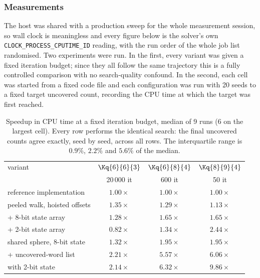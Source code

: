 \subsubsection*{Measurements}

The host was shared with a production sweep for the whole measurement
session, so wall clock is meaningless and every figure below is the solver's
own \texttt{CLOCK\_PROCESS\_CPUTIME\_ID} reading, with the run order of the
whole job list randomised. Two experiments were run. In the first, every
variant was given a fixed iteration budget; since they all follow the same
trajectory this is a fully controlled comparison with no search-quality
confound. In the second, each cell was started from a fixed code file and
each configuration was run with 20 seeds to a fixed target uncovered count,
recording the CPU time at which the target was first reached.

\begin{table}[t]
\centering
\begin{tabular}{lccc}
\toprule
variant & $\Kq{6}{6}{3}$ & $\Kq{6}{8}{4}$ & $\Kq{8}{9}{4}$ \\
        & 20\,000 it & 600 it & 50 it \\
\midrule
reference implementation      & $1.00\times$ & $1.00\times$ & $1.00\times$ \\
peeled walk, hoisted offsets  & $1.35\times$ & $1.29\times$ & $1.13\times$ \\
\quad + 8-bit state array     & $1.28\times$ & $1.65\times$ & $1.65\times$ \\
\quad + 2-bit state array     & $0.82\times$ & $1.34\times$ & $2.44\times$ \\
shared sphere, 8-bit state    & $1.32\times$ & $1.95\times$ & $1.95\times$ \\
\quad + uncovered-word list   & $2.21\times$ & $5.57\times$ & $6.06\times$ \\
\quad with 2-bit state        & $2.14\times$ & $\mathbf{6.32\times}$ & $\mathbf{9.86\times}$ \\
\bottomrule
\end{tabular}
\caption{Speedup in CPU time at a fixed iteration budget, median of 9 runs
(6 on the largest cell). Every row performs the identical search: the final
uncovered counts agree exactly, seed by seed, across all rows. The
interquartile range is $0.9\%$, $2.2\%$ and $5.6\%$ of the median.}
\label{tab:engfixed}
\end{table}

